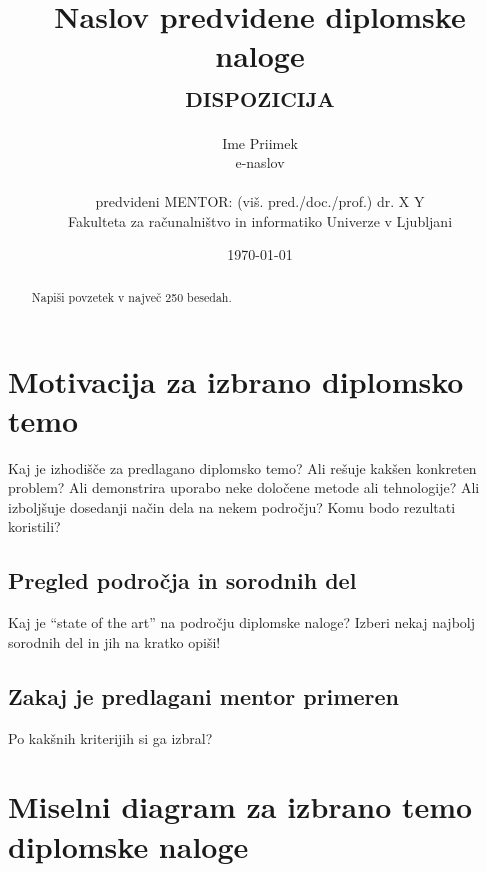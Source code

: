 \documentclass[11pt,a4paper]{article}
\title{Naslov predvidene diplomske naloge\\
\textsc{dispozicija}}
\author{Ime Priimek\\
e-naslov\\
\ \\
predvideni MENTOR: (viš. pred./doc./prof.) dr. X Y \\
Fakulteta za računalništvo in informatiko Univerze v Ljubljani
\date{\today}         
}
\begin{document}
\maketitle

\begin{abstract}
Napiši povzetek v največ 250 besedah.
\end{abstract}


\section{Motivacija za izbrano diplomsko temo}

Kaj je izhodišče za predlagano diplomsko temo? 
Ali rešuje kakšen konkreten problem? 
Ali demonstrira uporabo neke določene metode ali tehnologije?
Ali izboljšuje dosedanji način dela na nekem področju?
Komu bodo rezultati koristili?

\subsection{Pregled področja in sorodnih del}

Kaj je ``state of the art'' na področju diplomske naloge?
Izberi nekaj najbolj sorodnih del in jih na kratko opiši!


\subsection{Zakaj je predlagani mentor primeren}

Po kakšnih kriterijih si ga izbral?



\section{Miselni diagram za izbrano temo diplomske naloge}
\end{document}
